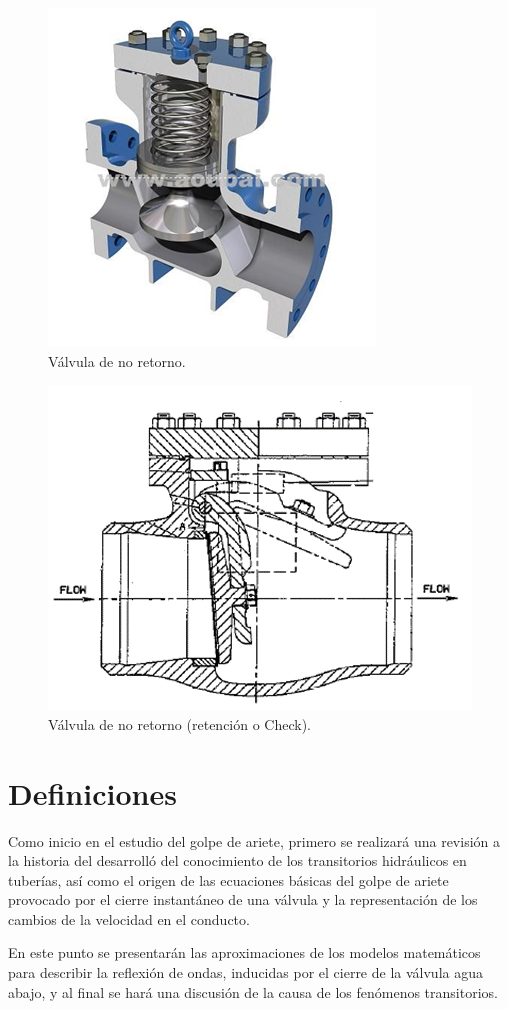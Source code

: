 \documentclass[letterpaper]{report}
\begin{document}
\newpage
\vspace*{1cm}
\begin{figure}[H]
	\centering
	\includegraphics[width=0.5\linewidth]{fig9}
	\caption{Válvula de no retorno.}
	\label{fig:fig9}
\end{figure}
\vspace*{1cm}
\begin{figure}[H]
	\centering
	\includegraphics[width=.55\linewidth]{fig10}
	\caption{Válvula de no retorno (retención o Check).}
	\label{fig:fig10}
\end{figure}
\newpage

\section{Definiciones}
Como inicio en el estudio del golpe de ariete, primero se realizará una revisión a la historia del desarrolló 
del conocimiento de los transitorios hidráulicos en tuberías, así como el origen de las ecuaciones básicas del 
golpe de ariete provocado por el cierre instantáneo de una válvula y la representación de los cambios de la 
velocidad en el conducto. \bigskip

En este punto se presentarán las aproximaciones de los modelos matemáticos para describir la reflexión de ondas, 
inducidas por el cierre de la válvula agua abajo, y al final se hará una discusión de la causa de los fenómenos transitorios.\bigskip
\end{document}
